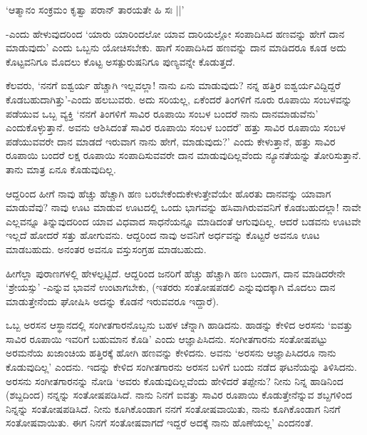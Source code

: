 \begin{shloka}
`ಆತ್ಮಾನಂ ಸಂಕ್ರಮಂ ಕೃತ್ವಾ ಪರಾನ್ ತಾರಯತೇ ಹಿ ಸಃ ||'
\end{shloka}

-ಎಂದು ಹೇಳುವುದರಿಂದ `ಯಾರು ಯಾರಿಂದಲೋ ಯಾವ ದಾರಿಯಲ್ಲೋ ಸಂಪಾದಿಸಿದ ಹಣವನ್ನು ಹೇಗೆ ದಾನ ಮಾಡುವುದು' ಎಂದು ಒಬ್ಬನು ಯೋಚಿಸಬೇಕು. ಹಾಗೆ ಸಂಪಾದಿಸಿದ ಹಣವನ್ನು ದಾನ ಮಾಡಿದರೂ ಕೂಡ ಅದು ಕೊಟ್ಟವನಿಗೂ ಮೊದಲು ಕೊಟ್ಟ ಅಸತ್ಪುರುಷನಿಗೂ ಪುಣ್ಯವನ್ನೇ ಕೊಡುತ್ತದೆ.

ಕೆಲವರು, `ನನಗೆ ಐಶ್ವರ್ಯ ಹೆಚ್ಚಾಗಿ ಇಲ್ಲವಲ್ಲಾ! ನಾನು ಏನು ಮಾಡುವುದು? ನನ್ನ ಹತ್ತಿರ ಐಶ್ವರ್ಯವಿದ್ದಿದ್ದರೆ ಕೊಡಬಹುದಾಗಿತ್ತು'-ಎಂದು ಹಲಬುವರು. ಅದು ಸರಿಯಲ್ಲ, ಏಕೆಂದರೆ ತಿಂಗಳಿಗೆ ನೂರು ರೂಪಾಯಿ ಸಂಬಳವನ್ನು ಪಡೆಯುವ ಒಬ್ಬ ವ್ಯಕ್ತಿ `ನನಗೆ ತಿಂಗಳಿಗೆ ಸಾವಿರ ರೂಪಾಯಿ ಸಂಬಳ ಬಂದರೆ ನಾನು ದಾನಮಾಡುವೆನು' ಎಂದುಕೊಳ್ಳುತ್ತಾನೆ. ಅವನು ಆಶಿಸಿದಂತೆ ಸಾವಿರ ರೂಪಾಯಿ ಸಂಬಳ ಬಂದರೆ' ಹತ್ತು ಸಾವಿರ ರೂಪಾಯಿ ಸಂಬಳ ಪಡೆಯುವವರೇ ದಾನ ಮಾಡದೆ ಇರುವಾಗ ನಾನು ಹೇಗೆ, ಮಾಡುವುದು?' ಎಂದು ಕೇಳುತ್ತಾನೆ, ಹತ್ತು ಸಾವಿರ ರೂಪಾಯಿ ಬಂದರೆ ಲಕ್ಷ ರೂಪಾಯಿ ಸಂಪಾದಿಸುವವರೇ ದಾನ ಮಾಡುವುದಿಲ್ಲವೆಂದು ನ್ಯೂನತೆಯನ್ನು ತೋರಿಸುತ್ತಾನೆ. ತಾನು ಮಾತ್ರ ಏನೂ ಕೊಡುವುದಿಲ್ಲ.

ಆದ್ದರಿಂದ ಹೀಗೆ ನಾವು ಹೆಚ್ಚು ಹೆಚ್ಚಾಗಿ ಹಣ ಬರಬೇಕೆಂದುಕೇಳುತ್ತೇವೆಯೇ ಹೊರತು ದಾನವನ್ನು ಯಾವಾಗ ಮಾಡುವೆವು? ನಾವು ಊಟ ಮಾಡುವ ಊಟದಲ್ಲಿ ಒಂದು ಭಾಗವನ್ನು ಹಸಿವಾಗಿರುವವನಿಗೆ ಕೊಡಬಹುದಲ್ಲಾ! ನಾವೇ ಎಲ್ಲವನ್ನೂ ತಿನ್ನುವುದರಿಂದ ಯಾವ ವಿಧವಾದ ಸಾಧನೆಯನ್ನೂ ಮಾಡಿದಂತೆ ಆಗುವುದಿಲ್ಲ. ಆದರೆ ಬಡವನು ಊಟವೇ ಇಲ್ಲದೆ ಹೋದರೆ ಸತ್ತು ಹೋಗುವನು. ಆದ್ದರಿಂದ ನಾವು ಅವನಿಗೆ ಅರ್ಧವನ್ನು ಕೊಟ್ಟರೆ ಅವನೂ ಊಟ ಮಾಡಬಹುದು. ಅನಂತರ ಅವನೂ ವಸ್ತುಸಂಗ್ರಹ ಮಾಡಬಹುದು.

ಹೀಗೆಲ್ಲಾ ಪುರಾಣಗಳಲ್ಲಿ ಹೇಳಲ್ಪಟ್ಟಿದೆ. ಆದ್ದರಿಂದ ಜನರಿಗೆ ಹೆಚ್ಚು ಹೆಚ್ಚಾಗಿ ಹಣ ಬಂದಾಗ, ದಾನ ಮಾಡಿದರೇನೇ `ಶ್ರೇಯಸ್ಸು' -ಎನ್ನುವ ಭಾವನೆ ಉಂಟಾಗಬೇಕು, (ಇತರರು ಸಂತೋಷಪಡಲಿ ಎನ್ನುವುದಕ್ಕಾಗಿ ಮೊದಲು ದಾನ ಮಾಡುತ್ತೇನೆಂದು ಘೋಷಿಸಿ ಅದನ್ನು ಕೊಡನೆ ಇರುವವರೂ ಇದ್ದಾರೆ).

ಒಬ್ಬ ಅರಸನ ಆಸ್ಥಾನದಲ್ಲಿ ಸಂಗೀತಗಾರನೊಬ್ಬನು ಬಹಳ ಚೆನ್ನಾಗಿ ಹಾಡಿದನು. ಹಾಡನ್ನು ಕೇಳಿದ ಅರಸನು `ಐವತ್ತು ಸಾವಿರ ರೂಪಾಯಿ ಇವರಿಗೆ ಬಹುಮಾನ ಕೊಡಿ' ಎಂದು ಆಜ್ಞಾಪಿಸಿದನು. ಸಂಗೀತಗಾರನು ಸಂತೋಷಪಟ್ಟು ಅರಮನೆಯ ಖಜಾಂಚಿಯ ಹತ್ತಿರಕ್ಕೆ ಹೋಗಿ ಹಣವನ್ನು ಕೇಳಿದನು. ಅವನು `ಅರಸನು ಆಜ್ಞಾಪಿಸಿದರೂ ನಾನು ಕೊಡುವುದಿಲ್ಲ' ಎಂದನು. ಇದನ್ನು ಕೇಳಿದ ಸಂಗೀತಗಾರನು ಅರಸನ ಬಳಿಗೆ ಬಂದು ನಡೆದ ಘಟನೆಯನ್ನು ತಿಳಿಸಿದನು. ಅರಸನು ಸಂಗೀತಗಾರನನ್ನು ನೋಡಿ `ಅವರು ಕೊಡುವುದಿಲ್ಲವೆಂದು ಹೇಳಿದರೆ ತಪ್ಪೇನು? ನೀನು ನಿನ್ನ ಹಾಡಿನಿಂದ (ಶಬ್ದದಿಂದ) ನನ್ನನ್ನು ಸಂತೋಷಪಡಿಸಿದೆ. ನಾನು ನಿನಗೆ ಐವತ್ತು ಸಾವಿರ ರೂಪಾಯಿ ಕೊಡುತ್ತೇನೆನ್ನುವ ಶಬ್ದಗಳಿಂದ ನಿನ್ನನ್ನು ಸಂತೋಷಪಡಿಸಿದೆ. ನೀನು ಕೂಗಿಕೊಂಡಾಗ ನನಗೆ ಸಂತೋಷವಾಯಿತು, ನಾನು ಕೂಗಿಕೊಂಡಾಗ ನಿನಗೆ ಸಂತೋಷವಾಯಿತು. ಈಗ ನಿನಗೆ ಸಂತೋಷವಾಗದೆ ಇದ್ದರೆ ಅದಕ್ಕೆ ನಾನು ಹೊಣೆಯಲ್ಲ' ಎಂದನಂತೆ.


